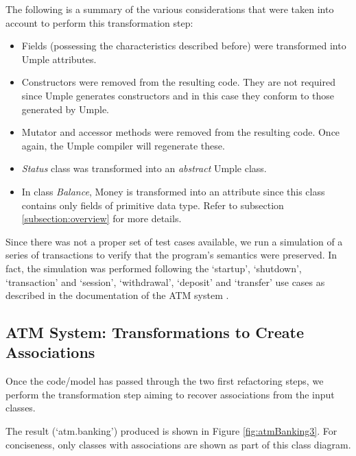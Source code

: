 The following is a summary of the various considerations that were taken into account to perform this transformation step:

\begin{itemize}
\item Fields (possessing the characteristics described before) were transformed into Umple attributes. 

\item Constructors were removed from the resulting code. They are not required since Umple generates constructors and in this case they conform to those generated by Umple. 

\item Mutator and accessor methods were removed from the resulting code. Once again, the Umple compiler will regenerate these. 

\item \textit{Status} class was transformed into an \textit{abstract} Umple class. 

\item In class \textit{Balance}, Money is transformed into an attribute since this class contains only fields of primitive data type. Refer to subsection \ref{subsection:overview} for more details.
\end{itemize}

Since there was not a proper set of test cases available, we run a simulation of a series of transactions to verify that the program's semantics were preserved. In fact, the simulation was performed following the  `startup', `shutdown', `transaction' and `session', `withdrawal', `deposit' and `transfer' use cases as described in the documentation of the ATM system \cite{atmsystem}.


\subsection{ATM System: Transformations to Create Associations}

Once the code/model has  passed through the two first refactoring steps, we perform the transformation step aiming to recover associations from the input classes.

The result (`atm.banking') produced is shown in Figure \ref{fig:atmBanking3}. For conciseness, only classes with associations are shown as part of this class diagram. 

